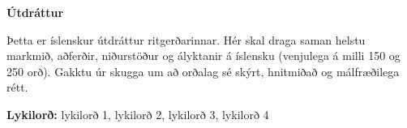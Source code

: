 \thispagestyle{plain}%

\vspace*{1.8cm}
\begin{center}
  \singlespacing%
  {\bfseries\Large \thesisTitleIS\par}
  \vspace{0.8\baselineskip}
  {\large \thesisAuthor\par}
  \vspace{0.8\baselineskip}
  {\large \thesisDateIS\par}
\end{center}

\vspace{1.5\baselineskip}

{\centering\bfseries Útdráttur\par}
\nopagebreak\vspace{0.5\baselineskip}

Þetta er íslenskur útdráttur ritgerðarinnar. Hér skal draga saman helstu markmið, aðferðir, niðurstöður og ályktanir á íslensku (venjulega á milli 150 og 250 orð). Gakktu úr skugga um að orðalag sé skýrt, hnitmiðað og málfræðilega rétt.

\vspace{1.5\baselineskip}
\noindent\textbf{Lykilorð:} lykilorð 1, lykilorð 2, lykilorð 3, lykilorð 4\par
